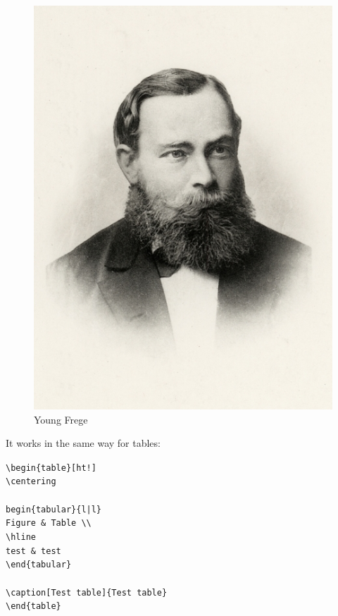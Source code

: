 \begin{figure}[ht!]
	\centering
	\includegraphics[scale=.45]{graphics/Young-Frege}
	\caption[Young Frege]{Young Frege}
	\label{fig:Frege}
\end{figure}




\noindent It works in the same way for tables:

\bigskip


{\footnotesize
\noindent \texttt{\textbackslash begin\{table\}[ht!]\\
	\textbackslash centering\\
	\\
	\texttt begin\{tabular\}\{l|l\}\\
	Figure \& Table \textbackslash\textbackslash \\
	\textbackslash hline \\
	test \& test \\
	\textbackslash end\{tabular\}\\
	\\
	\textbackslash caption[Test table]\{Test table\} \\
	\textbackslash end\{table\} }}


